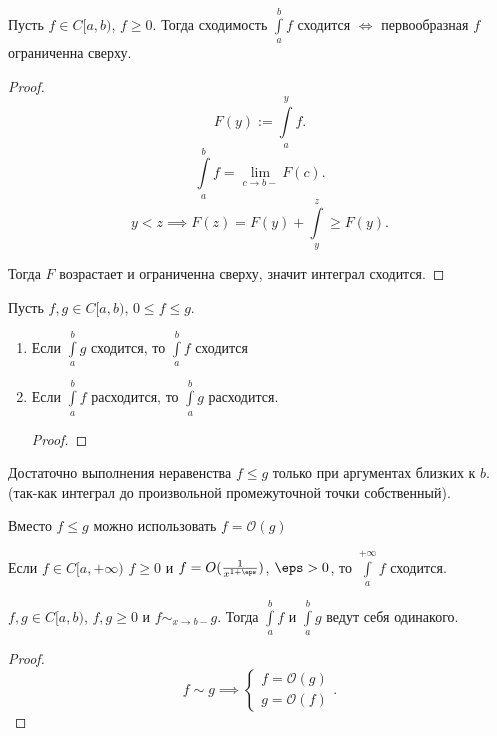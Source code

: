 \begin{theorem} \thmslashn

    Пусть $f\in C[a, b)$, $f \ge 0$. Тогда сходимость $\int\limits_{a}^{b} f$ сходится $\iff$ первообразная $f$ ограниченна сверху.
    \begin{proof}
        \[ F(y) := \int\limits_{a}^{y} f  .\] 
        \[ \int\limits_{a}^{b} f = \lim\limits_{c \to b-} F(c)  .\]
        \[ y < z \implies F(z) = F(y) + \int\limits_{y}^{z} \ge F(y)  .\]

        Тогда $F$ возрастает и ограниченна сверху, значит интеграл сходится.
    \end{proof}
\end{theorem}
\begin{consequence} \thmslashn

    Пусть $f, g\in C[a, b)$, $0 \le f \le g$.

    \begin{enumerate}
        \item Если $\int\limits_{a}^{b} g $ сходится, то $\int\limits_{a}^{b} f $ сходится
        \item Если $\int\limits_{a}^{b} f $ расходится, то $\int\limits_{a}^{b} g $ расходится.
        \begin{proof}
            \TODO
        \end{proof}
    \end{enumerate}
\end{consequence}
\begin{remark} \thmslashn

    Достаточно выполнения неравенства $f \le g$ только при аргументах близких к $b$. (так-как интеграл до произвольной промежуточной точки собственный).

    Вместо $f\le g$ можно использовать $f = \mathcal{O}(g)$

    Если $f\in C[a, +\infty) $ $f \ge 0$ и $f= O(\frac{1}{x^{1+\eps}})$, $\eps > 0$, то $\int\limits_{a}^{+\infty} f $ сходится.
\end{remark}
\begin{consequence} \thmslashn

    $f, g\in C[a, b)$, $f, g \ge 0$ и $f\sim_{x\to b-} g$. Тогда $\int\limits_{a}^{b} f $ и $\int\limits_{a}^{b} g $ ведут себя одинакого.
    \begin{proof}
        \[ f \sim g \implies \begin{cases}
            f = \mathcal{O}(g)\\
            g = \mathcal{O}(f)
        \end{cases} .\] 
    \end{proof}
\end{consequence}
